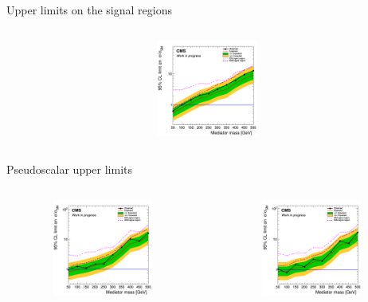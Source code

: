 \documentclass[8pt]{beamer}
\begin{document}
\begin{frame}{Upper limits on the signal regions}
\begin{columns}
\begin{column}{0.33\textwidth}
\begin{center}
			\begin{block}{}\end{block} \vspace{-10pt}
     			\includegraphics[width=1.0\textwidth, height=90pt]{figs/limit_scalar_2018_attempt7.png}
    		\end{center}		
		\end{column}
\end{columns}

\begin{columns}
\begin{column}{1.09\textwidth}
\begin{block}{\centering Pseudoscalar upper limits}\end{block}
\end{column}
\end{columns} \vspace{-15pt}
\begin{columns}
		\begin{column}{0.33\textwidth}
			\begin{center}
     			\includegraphics[width=1.0\textwidth, height=90pt]{figs/limit_pseudo_2016_attempt7.png}
    		\end{center}		
		\end{column}
		\begin{column}{0.33\textwidth}
			\begin{center}
     			\includegraphics[width=1.0\textwidth, height=90pt]{figs/limit_pseudo_2017_attempt7.png}

\end{center}
\end{column}
\end{columns}
\end{frame}
\end{document}

